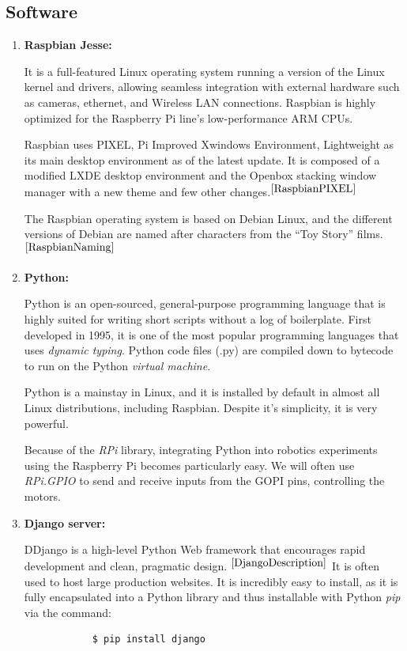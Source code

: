 	
	
	
	
	
	
	\subsection{Software}
	
	\begin{enumerate}
		\item \textbf{Raspbian Jesse:} 
		
			It is a full-featured Linux operating system running a version of the Linux kernel and drivers, allowing seamless integration with external hardware such as cameras, ethernet, and Wireless LAN connections. Raspbian is highly optimized for the Raspberry Pi line's low-performance ARM CPUs.
			
			Raspbian uses PIXEL, Pi Improved Xwindows Environment, Lightweight as its main desktop environment as of the latest update. It is composed of a modified LXDE desktop environment and the Openbox stacking window manager with a new theme and few other changes.${}^{\cite{RaspbianPIXEL}}$ 
			
			The Raspbian operating system is based on Debian Linux, and the different versions of Debian are named after characters from the “Toy Story” films.${}^{\cite{RaspbianNaming}}$
		
		
		\item \textbf{Python:} 
		
		
		Python is an open-sourced, general-purpose programming language that is highly suited for writing short scripts without a log of boilerplate. First developed in 1995, it is one of the most popular programming languages that uses \textit{dynamic typing}. Python code files (.py) are compiled down to bytecode to run on the Python \textit{virtual machine}. 
		
		Python is a mainstay in Linux, and it is installed by default in almost all Linux distributions, including Raspbian. Despite it's simplicity, it is very powerful. 
		
		Because of the \textit{RPi} library, integrating Python into robotics experiments using the Raspberry Pi becomes particularly easy. We will often use \textit{RPi.GPIO} to send and receive inputs from the GOPI pins, controlling the motors. 
		
		
		\item \textbf{Django server:}
		
		DDjango is a high-level Python Web framework that encourages rapid development and clean, pragmatic design. ${}^{\cite{DjangoDescription}}$ It is often used to host large production websites. It is incredibly easy to install, as it is fully encapsulated into a Python library and thus installable with Python \textit{pip} via the command: 
		\begin{verbatim}  
			$ pip install django
		\end{verbatim}
		

\end{enumerate}
